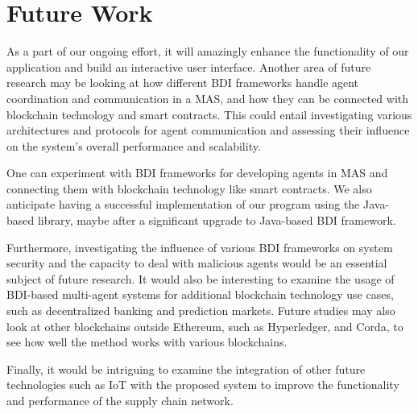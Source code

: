 {\chapter{Future Work}}
As a part of our ongoing effort, it will amazingly enhance the functionality of our application and build an interactive user interface. Another area of future research may be looking at how different \ac{BDI} frameworks handle agent coordination and communication in a \ac{MAS}, and how they can be connected with blockchain technology and smart contracts. This could entail investigating various architectures and protocols for agent communication and assessing their influence on the system's overall performance and scalability.

\vspace{.5cm}

One can experiment with \ac{BDI} frameworks for developing agents in \ac{MAS} and connecting them with blockchain technology like smart contracts. We also anticipate having a successful implementation of our program using the Java-based library, maybe after a significant upgrade to Java-based \ac{BDI} framework.

\vspace{.5cm}

Furthermore, investigating the influence of various \ac{BDI} frameworks on system security and the capacity to deal with malicious agents would be an essential subject of future research. It would also be interesting to examine the usage of \ac{BDI}-based multi-agent systems for additional blockchain technology use cases, such as decentralized banking and prediction markets. Future studies may also look at other blockchains outside Ethereum, such as Hyperledger, and Corda, to see how well the method works with various blockchains.

\vspace{.5cm}

Finally, it would be intriguing to examine the integration of other future technologies such as \ac{IoT} with the proposed system to improve the functionality and performance of the supply chain network.